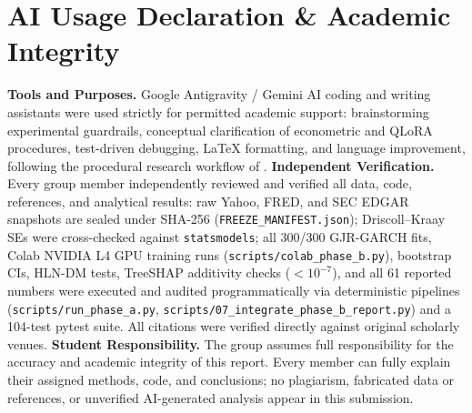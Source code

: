 \documentclass[11pt,a4paper]{article}
\begin{document}
\section*{AI Usage Declaration \& Academic Integrity}
\textbf{Tools and Purposes.} Google Antigravity / Gemini AI coding and
writing assistants were used strictly for permitted academic support:
brainstorming experimental guardrails, conceptual clarification of econometric
and QLoRA procedures, test-driven debugging, LaTeX formatting, and language
improvement, following the procedural research workflow of
\citet{kassis2026skills}.
\textbf{Independent Verification.} Every group member independently reviewed
and verified all data, code, references, and analytical results: raw Yahoo,
FRED, and SEC EDGAR snapshots are sealed under SHA-256
(\texttt{FREEZE\_MANIFEST.json}); Driscoll--Kraay SEs were cross-checked
against \texttt{statsmodels}; all 300/300 GJR-GARCH fits, Colab NVIDIA L4 GPU
training runs (\texttt{scripts/colab\_phase\_b.py}), bootstrap CIs, HLN-DM
tests, TreeSHAP additivity checks ($< 10^{-7}$), and all 61 reported numbers
were executed and audited programmatically via deterministic pipelines
(\texttt{scripts/run\_phase\_a.py},
\texttt{scripts/07\_integrate\_phase\_b\_report.py}) and a 104-test pytest
suite. All citations were verified directly against original scholarly venues.
\textbf{Student Responsibility.} The group assumes full responsibility for
the accuracy and academic integrity of this report. Every member can fully
explain their assigned methods, code, and conclusions; no plagiarism,
fabricated data or references, or unverified AI-generated analysis appear in
this submission.
\end{document}

